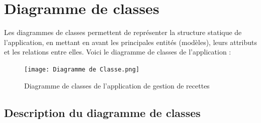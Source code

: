 \documentclass[12pt,a4paper]{report}
\begin{document}
\section{Diagramme de classes}

Les diagrammes de classes permettent de représenter la structure statique de l’application, en mettant en avant les principales entités (modèles), leurs attributs et les relations entre elles. Voici le diagramme de classes de l’application :

\begin{figure}[H]
    \centering
    \texttt{[image: Diagramme de Classe.png]}
    \caption{Diagramme de classes de l’application de gestion de recettes}
    \label{fig:class_diagram}
\end{figure}

\subsection*{Description du diagramme de classes}
\end{document}
